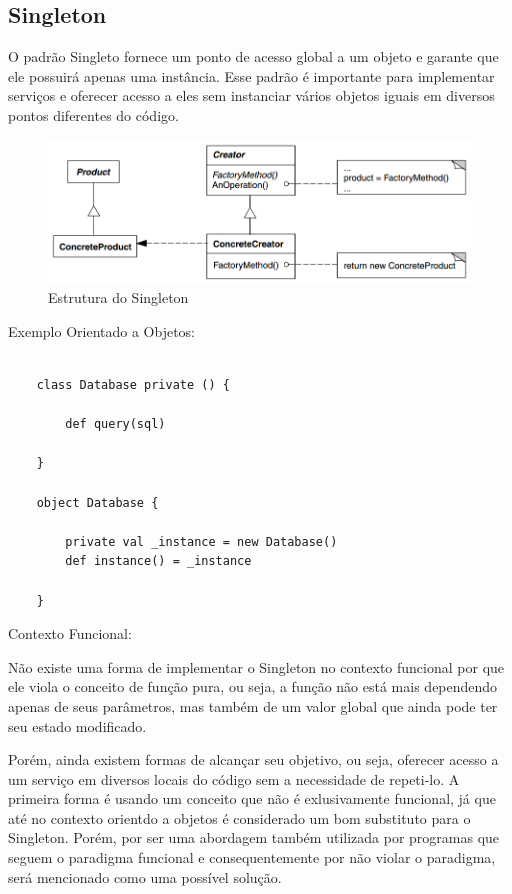 \subsection{Singleton}

O padrão Singleto fornece um ponto de acesso global a um objeto 
e garante que ele possuirá apenas uma instância. Esse padrão 
é importante para implementar serviços e oferecer acesso a eles
sem instanciar vários objetos iguais em diversos pontos diferentes 
do código.


\begin{figure}[htb]
	\caption{\label{fig_grafico}Estrutura do Singleton}
	\begin{center}
	    \includegraphics[scale=0.5]{5_padroes-contexto-funcional/5.1_criacionais/5.1.1_factory-method/diagram.png}
	\end{center}
\end{figure}

Exemplo Orientado a Objetos:

\begin{lstlisting}[caption={Singleton Orientação a Objetos},label=oofactory]
    
    class Database private () {

        def query(sql)

    }

    object Database {

        private val _instance = new Database()
        def instance() = _instance

    }

\end{lstlisting}

Contexto Funcional:

Não existe uma forma de implementar o Singleton no contexto funcional 
por que ele viola o conceito de função pura, ou seja, a função não 
está mais dependendo apenas de seus parâmetros, mas também de um 
valor global que ainda pode ter seu estado modificado.

Porém, ainda existem formas de alcançar seu objetivo, ou seja, 
oferecer acesso a um serviço em diversos locais do código sem a necessidade 
de repeti-lo. A primeira forma é usando um conceito que não é exlusivamente funcional, 
já que até no contexto orientdo a objetos é considerado um bom substituto 
para o Singleton. Porém, por ser uma abordagem também utilizada por 
programas que seguem o paradigma funcional e consequentemente por não 
violar o paradigma, será mencionado como uma possível solução.

